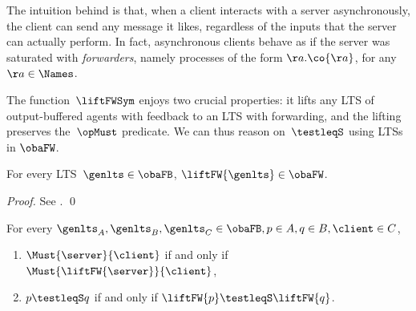 The intuition behind  %
is that, when a client interacts with a server asynchronously, the
client can send any message it likes, regardless of the inputs that
the server can actually perform. In fact, asynchronous clients behave
as if the server was saturated with \emph{forwarders}, namely
processes of the form $\aa. \co{\aa}$, for any $\aa\in\Names$.


\noindent
The function~$\liftFWSym$ enjoys two crucial properties: 
it lifts any LTS of output-buffered agents with feedback
to an LTS with forwarding, and the lifting preserves the~$\opMust$ predicate. We can thus
reason on~$\testleqS$ using LTSs in $\obaFW$.%

\begin{lemma}
  \label{lem:liftFW-works}
  For every LTS~$\genlts \in \obaFB$, $\liftFW{\genlts} \in \obaFW$.
\end{lemma}
\begin{proof}
  See .
  \qed
\end{proof}

\begin{lemma}
  \label{lem:musti-obafb-iff-musti-obafw}
  For every $\genlts_A, \genlts_B, \genlts_C \in \obaFB, \serverA \in A, \serverB \in B, \client \in C$,
  \begin{enumerate}
    \item
      $ \Must{\server}{\client}$ if and only if $\Must{\liftFW{\server}}{\client}$,
    \item
      $\serverA \testleqS \serverB$ if and only if $\liftFW{\serverA} \testleqS \liftFW{\serverB}$.
  \end{enumerate}
\end{lemma}






